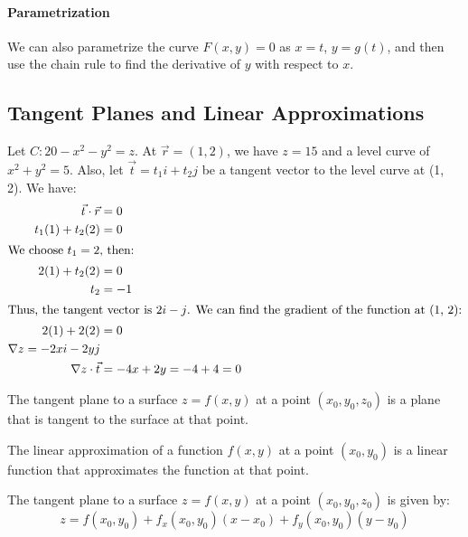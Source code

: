 \documentclass[11pt]{article}
\begin{document}
\paragraph{Parametrization} We can also parametrize the curve $F(x, y) = 0$ as $x=t$, $y=g(t)$, and then use the chain rule to find the derivative of $y$ with respect to $x$.
\subsection{Tangent Planes and Linear Approximations}
\begin{example}
    Let $C: 20 - x^2 - y^2 = z$. At $\vec{r} = (1,2)$, we have $z = 15$ and a level curve of $x^2 + y^2 = 5$. Also, let $\vec{t} = t_1i + t_2j$ be a tangent vector to the level curve at (1, 2). We have:
    \begin{align*}
        \vec{t}\cdot \vec{r} &= 0 \\
        t_1(1) + t_2(2) &= 0 \\
        \intertext{We choose $t_1 = 2$, then:}
        2(1) + t_2(2) &= 0 \\
        t_2 &= -1 \\
        \intertext{Thus, the tangent vector is $2i - j$. We can find the gradient of the function at (1, 2):}
        2(1) + 2(2) &= 0 \\
        \nabla z = -2xi - 2yj \\
        \nabla z \cdot \vec{t} &= -4x + 2y = -4 + 4 = 0
    \end{align*}
\end{example}
\begin{definition}
    The tangent plane to a surface $z = f(x, y)$ at a point $(x_0, y_0, z_0)$ is a plane that is tangent to the surface at that point.
\end{definition}
\begin{definition}
    The linear approximation of a function $f(x, y)$ at a point $(x_0, y_0)$ is a linear function that approximates the function at that point.
\end{definition}
\begin{theorem}
    The tangent plane to a surface $z = f(x, y)$ at a point $(x_0, y_0, z_0)$ is given by:
    \begin{equation}
        z = f(x_0, y_0) + f_x(x_0, y_0)(x - x_0) + f_y(x_0, y_0)(y - y_0)
    \end{equation}
\end{theorem}
\end{document}
